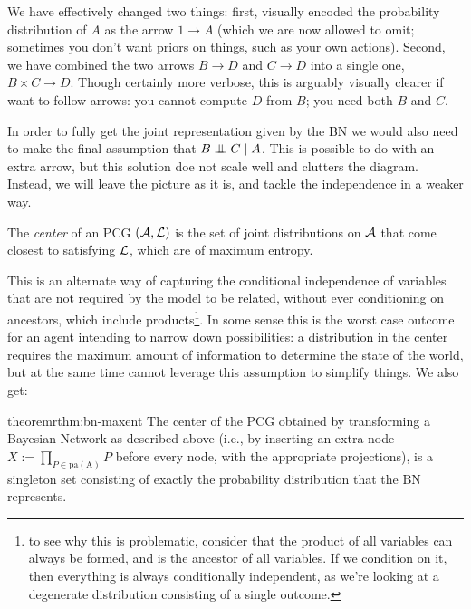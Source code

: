 \documentclass{article}
\begin{document}
	We have effectively changed two things: first, visually encoded the probability distribution of $A$ as the arrow $1 \to A$ (which we are now allowed to omit; sometimes you don't want priors on things, such as your own actions). Second, we have combined the two arrows $B \to D$ and $C \to D$ into a single one, $B \times C \to D$. Though certainly more verbose, this is arguably visually clearer if want to follow arrows: you cannot compute $D$ from $B$; you need both $B$ and $C$.
	
	In order to fully get the joint representation given by the BN we would also need to make the final assumption that $B \mathrel{\perp\mspace{-10mu}\perp} C \mid A$. This is possible to do with an extra arrow, but this solution doe not scale well and clutters the diagram. Instead, we will leave the picture as it is, and tackle the independence in a weaker way.
	
	\begin{defn*}
		The \emph{center} of an PCG $(\cal A, L)$ is the set of joint distributions on $\cal A$ that come closest to satisfying $\cal L$, which are of maximum entropy.
	\end{defn*}
	
	This is an alternate way of capturing the conditional independence of variables that are not required by the model to be related, without ever conditioning on ancestors, which include products\footnote{to see why this is problematic, consider that the product of all variables can always be formed, and is the ancestor of all variables. If we condition on it, then everything is always conditionally independent, as we're looking at a degenerate distribution consisting of a single outcome.}.  In some sense this is the worst case outcome for an agent intending to narrow down possibilities: a distribution in the center requires the maximum amount of information to determine the state of the world, but at the same time cannot leverage this assumption to simplify things. %
	We also get:
	
	
	\begin{restatable}{theorem}{rthm:bn-maxent} \label{rthm:bn-maxent}
		The center of the PCG obtained by transforming a Bayesian Network as described above (i.e., by inserting an extra node $X := \prod_{P \in \mathrm{pa(A)}} P$ before every node, with the appropriate projections), is a singleton set consisting of exactly the probability distribution that the BN represents.
	\end{restatable}
	
\end{document}
